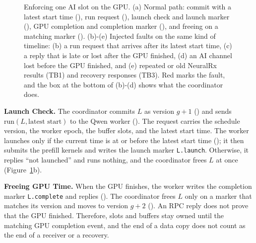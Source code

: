 \documentclass[acmsmall,screen,review,anonymous]{acmart}
\newcommand{\NRx}{NeuralRx\xspace}
\begin{document}
\begin{figure}[H]
  \centering
  
  \caption{Enforcing one AI slot on the GPU. (a) Normal path: commit with a latest start time
  (), run request (), launch check and launch marker (), GPU completion
  and completion marker (), and freeing on a matching marker (). (b)-(e) Injected
  faults on the same kind of timeline: (b) a run request that arrives after its latest start time, (c) a
  reply that is late or lost after the GPU finished, (d) an AI channel lost before the GPU finished, and
  (e) repeated or old \NRx results (TB1) and recovery responses (TB3). Red marks the fault, and the box at
  the bottom of (b)-(d) shows what the coordinator does.}
  \label{fig:refinement}
\end{figure}

\noindent\textbf{Launch Check.}
The coordinator commits $L$ as version $g+1$ () and sends $\mathrm{run}(L,\text{latest start})$
to the Qwen worker (). The request carries the schedule version, the worker epoch, the buffer
slots, and the latest start time. The worker launches only if the current time is at or before the latest
start time (); it then submits the prefill kernels and writes the launch marker
\texttt{L.launch}. Otherwise, it replies ``not launched'' and runs nothing, and the coordinator frees $L$
at once (Figure~\ref{fig:refinement}b).

\noindent\textbf{Freeing GPU Time.}
When the GPU finishes, the worker writes the completion marker \texttt{L.complete} and replies
(). The coordinator frees $L$ only on a marker that matches its version and moves to version
$g+2$ (). An RPC reply does not prove that the GPU finished. Therefore, slots and buffers stay
owned until the matching GPU completion event, and the end of a data copy does not count as the end of a
receiver or a recovery.
\end{document}
